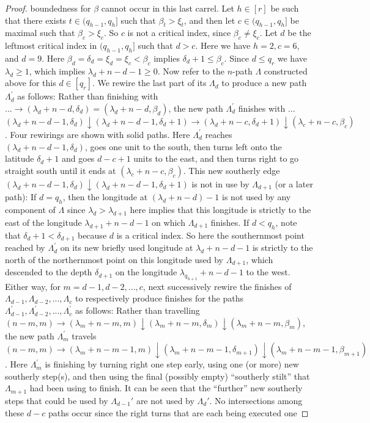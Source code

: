 \documentclass[11pt]{article}
\theoremstyle{definition}
\theoremstyle{remark}
\numberwithin{equation}{section}
\begin{document}
\begin{spacing}{1.35}
\begin{proof}
\vspace{1pc}\noindent boundedness for $\beta$ cannot occur in this last carrel.  Let $h \in [r]$ be such that there exists $t \in (q_{h-1}, q_h]$ such that $\beta_t > \xi_t$, and then let $c \in (q_{h-1}, q_h]$ be maximal such that $\beta_c > \xi_c$.  So $c$ is not a critical index, since $\beta_c \neq \xi_c$.  Let $d$ be the leftmost critical index in $(q_{h-1},q_h]$ such that $d > c$.  Here we have $h = 2, c = 6$, and $d = 9$.  Here $\beta_d = \delta_d = \xi_d = \xi_c < \beta_c$ implies $\delta_d+1 \leq \beta_c$.  Since $d \leq q_r$ we have $\lambda_d \geq 1$, which implies $\lambda_d + n - d - 1 \geq 0$.  Now refer to the $n$-path $\Lambda$ constructed above for this $d \in [q_r]$.  We rewire the last part of its $\Lambda_d$ to produce a new path $\Lambda_d^\prime$ as follows:  Rather than finishing with $... \rightarrow (\lambda_d + n-d, \delta_d) = (\lambda_d+n-d, \beta_d)$, the new path $\Lambda_d^\prime$ finishes with $...$ $(\lambda_d + n-d-1, \delta_d) \downarrow (\lambda_d+n-d-1, \delta_d+1) \rightarrow (\lambda_d + n-c, \delta_d+1) \downarrow (\lambda_c+n-c, \beta_c)$.  Four rewirings are shown with solid paths.  Here $\Lambda_d^\prime$ reaches $(\lambda_d+n-d-1, \delta_d)$, goes one unit to the south, then turns left onto the latitude $\delta_d + 1$ and goes $d-c+1$ units to the east, and then turns right to go straight south until it ends at $(\lambda_c+n-c, \beta_c)$.  This new southerly edge $(\lambda_d+n-d-1, \delta_d) \downarrow (\lambda_d+n-d-1, \delta_d+1)$ is not in use by $\Lambda_{d+1}$ (or a later path):  If $d = q_h$, then the longitude at $(\lambda_d+n-d)-1$ is not used by any component of $\Lambda$ since $\lambda_d > \lambda_{d+1}$ here implies that this longitude is strictly to the east of the longitude $\lambda_{d+1}+n-d-1$ on which $\Lambda_{d+1}$ finishes.  If $d < q_h$, note that $\delta_d+1 < \delta_{d+1}$ because $d$ is a critical index.  So here the southernmost point reached by $\Lambda_d^\prime$ on its new briefly used longitude at $\lambda_d+n-d-1$ is strictly to the north of the northernmost point on this longitude used by $\Lambda_{d+1}$, which descended to the depth $\delta_{d+1}$ on the longitude $\lambda_{q_{h+1}}+n-d-1$ to the west.  Either way, for $m = d-1, d-2, ... , c$, next successively rewire the finishes of $\Lambda_{d-1}, \Lambda_{d-2}, ... , \Lambda_c$ to respectively produce finishes for the paths $\Lambda_{d-1}^\prime, \Lambda_{d-2}^\prime, ... , \Lambda_c^\prime$ as follows:  Rather than travelling $(n-m, m) \rightarrow (\lambda_m+n-m,m) \downarrow (\lambda_m+n-m, \delta_m) \downarrow (\lambda_m+n-m, \beta_m)$, the new path $\Lambda_m^\prime$ travels $(n-m, m) \rightarrow (\lambda_m+n-m-1,m) \downarrow (\lambda_m+n-m-1, \delta_{m+1}) \downarrow (\lambda_m+n-m-1, \beta_{m+1})$.  Here $\Lambda_m^\prime$ is finishing by turning right one step early, using one (or more) new southerly step(s), and then using the final (possibly empty) ``southerly stilt'' that $\Lambda_{m+1}$ had been using to finish.  It can be seen that the ``further'' new southerly steps that could be used by $\Lambda_{d-1}'$ are not used by $\Lambda_d'$.  No intersections among these $d-c$ paths occur since the right turns that are each being executed one 
\end{proof}
\end{spacing}
\end{document}

